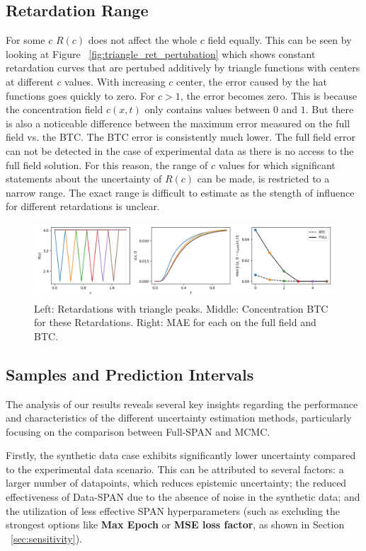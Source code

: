 \subsection{Retardation Range} %
For some $c$ $R(c)$ does not affect the whole $c$ field equally. This can be seen by looking at Figure ~\vref{fig:triangle_ret_pertubation} which shows constant retardation curves that are pertubed additively by triangle functions with centers at different $c$ values. With increasing $c$ center, the error caused by the hat functions goes quickly to zero. For $c > 1$, the error becomes zero. This is because the concentration field $c(x,t)$ only contains values between $0$ and $1$. But there is also a noticeable difference between the maximum error measured on the full field vs. the BTC. The BTC error is consistently much lower.
The full field error can not be detected in the case of experimental data as there is no access to the full field solution. For this reason, the range of $c$ values for which significant statements about the uncertainty of $R(c)$ can be made, is restricted to a narrow range. The exact range is difficult to estimate as the stength of influence for different retardations is unclear.


\begin{figure}[h]
    \centering
    \includegraphics{figs/triangle_ret_pertubation.png}
    \caption{Left: Retardations with triangle peaks. Middle: Concentration BTC for these Retardations. Right: MAE for each on the full field and BTC.}
    \label{fig:triangle_ret_pertubation}
\end{figure}


\subsection{Samples and Prediction Intervals}
The analysis of our results reveals several key insights regarding the performance and characteristics of the different uncertainty estimation methods, particularly focusing on the comparison between Full-SPAN and MCMC.

Firstly, the synthetic data case exhibits significantly lower uncertainty compared to the experimental data scenario. This can be attributed to several factors: a larger number of datapoints, which reduces epistemic uncertainty; the reduced effectiveness of Data-SPAN due to the absence of noise in the synthetic data; and the utilization of less effective SPAN hyperparameters (such as excluding the strongest options like \textbf{Max Epoch} or \textbf{MSE loss factor}, as shown in Section ~\vref{sec:sensitivity}).


